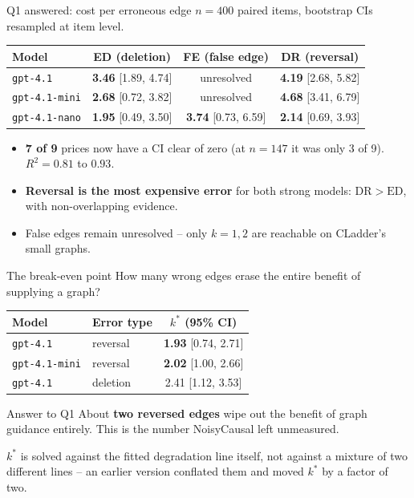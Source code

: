 \documentclass{beamer}
\begin{document}
\begin{frame}{Q1 answered: cost per erroneous edge}
  $n = 400$ paired items, bootstrap CIs resampled at item level.

  \begin{center}
  \small
  \begin{tabular}{lccc}
    \toprule
    Model & ED (deletion) & FE (false edge) & DR (reversal) \\
    \midrule
    \texttt{gpt-4.1}      & \textbf{3.46} [1.89, 4.74] & unresolved & \textbf{4.19} [2.68, 5.82] \\
    \texttt{gpt-4.1-mini} & \textbf{2.68} [0.72, 3.82] & unresolved & \textbf{4.68} [3.41, 6.79] \\
    \texttt{gpt-4.1-nano} & \textbf{1.95} [0.49, 3.50] & \textbf{3.74} [0.73, 6.59] & \textbf{2.14} [0.69, 3.93] \\
    \bottomrule
  \end{tabular}
  \end{center}

  \vspace{0.3cm}
  \begin{itemize}
    \item \textbf{7 of 9} prices now have a CI clear of zero
      (at $n{=}147$ it was only 3 of 9). $R^2 = 0.81$ to $0.93$.
    \item \textbf{Reversal is the most expensive error} for both strong models:
      $\mathrm{DR} > \mathrm{ED}$, with non-overlapping evidence.
    \item False edges remain unresolved -- only $k = 1, 2$ are reachable on
      CLadder's small graphs.
  \end{itemize}
\end{frame}

\begin{frame}{The break-even point}
  How many wrong edges erase the entire benefit of supplying a graph?

  \begin{center}
  \begin{tabular}{llc}
    \toprule
    Model & Error type & $k^*$ (95\% CI) \\
    \midrule
    \texttt{gpt-4.1}      & reversal & \textbf{1.93} [0.74, 2.71] \\
    \texttt{gpt-4.1-mini} & reversal & \textbf{2.02} [1.00, 2.66] \\
    \texttt{gpt-4.1}      & deletion & 2.41 [1.12, 3.53] \\
    \bottomrule
  \end{tabular}
  \end{center}

  \begin{block}{Answer to Q1}
    About \textbf{two reversed edges} wipe out the benefit of graph guidance
    entirely. This is the number NoisyCausal left unmeasured.
  \end{block}

  \vspace{0.2cm}
  $k^*$ is solved against the fitted degradation line itself, not against a
  mixture of two different lines -- an earlier version conflated them and moved
  $k^*$ by a factor of two.
\end{frame}
\end{document}
